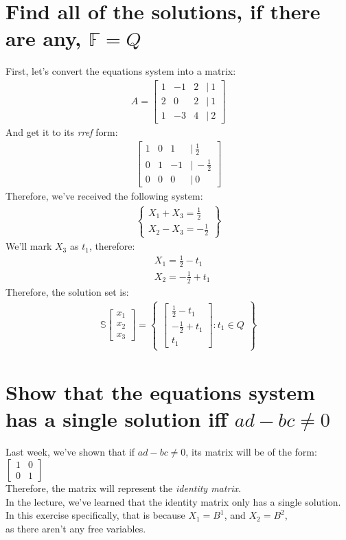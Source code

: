 \documentclass[a4paper, 12pt]{article}
\newcommand{\?}{\stackrel{?}{=}}
\newcommand{\F}{\ensuremath{\mathbb{F}}}
\newcommand{\eq}[1]{\begin{align*}#1\end{align*}}
\begin{document}
\section{Find all of the solutions, if there are any, $\F=Q$}
First, let's convert the equations system into a matrix:
\eq{A=\begin{bmatrix}
    1&-1&2&|~1\\
    2&0&2&|~1\\
    1&-3&4&|~2
\end{bmatrix}}
And get it to its \textit{rref} form:
\eq{\begin{bmatrix}
    1&0&1&|~\frac{1}{2}\\
    0&1&-1&|~-\frac{1}{2}\\
    0&0&0&|~0
\end{bmatrix}}
Therefore, we've received the following system:
\eq{\begin{Bmatrix}
    X_1+X_3=\frac{1}{2}\\
    X_2-X_3=-\frac{1}{2}
\end{Bmatrix}}
We'll mark $X_3$ as $t_1$, therefore:
\eq{&X_1=\frac{1}{2}-t_1\\&X_2=-\frac{1}{2}+t_1}
Therefore, the solution set is:
\eq{
    \mathbb{S}
    \begin{bmatrix}x_1\\x_2\\x_3\end{bmatrix}
    =
    \begin{Bmatrix}
        \begin{bmatrix}\frac{1}{2}-t_1\\-\frac{1}{2}+t_1\\t_1\end{bmatrix}
    :
    t_1\in{Q}
    \end{Bmatrix}
}
\pagebreak

\setcounter{section}{12}
\section{Show that the equations system has a single solution iff $ad-bc\neq{0}$}
Last week, we've shown that if $ad-bc\neq{0}$, its matrix will be of the form:
$\begin{bmatrix}
    1&0\\
    0&1
\end{bmatrix}$\\
Therefore, the matrix will represent the \textit{identity matrix}.\\
In the lecture, we've learned that the identity matrix only has a single solution.\\
In this exercise specifically, that is because $X_1=B^1$, and $X_2=B^2$,\\as there aren't any free variables.
\pagebreak
\end{document}
